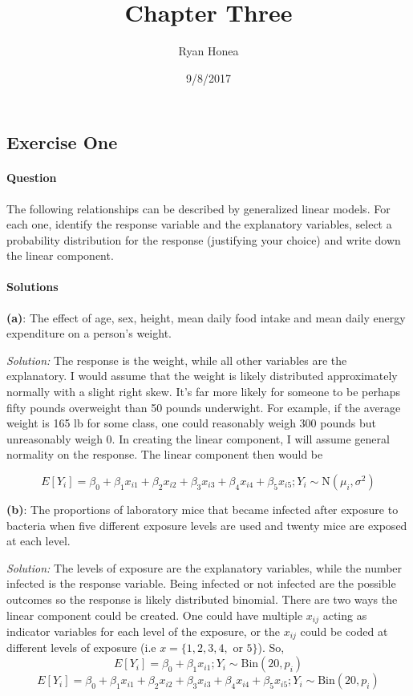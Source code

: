 \documentclass[]{article}
\title{Chapter Three}
\author{Ryan Honea}
\date{9/8/2017}
\let\oldparagraph\paragraph
\renewcommand{\paragraph}[1]{\oldparagraph{#1}\mbox{}}
\begin{document}
\maketitle

\subsection{Exercise One}\label{exercise-one}

\paragraph{Question}\label{question}

The following relationships can be described by generalized linear
models. For each one, identify the response variable and the explanatory
variables, select a probability distribution for the response
(justifying your choice) and write down the linear component.

\paragraph{Solutions}\label{solutions}

\textbf{(a)}: The effect of age, sex, height, mean daily food intake and
mean daily energy expenditure on a person's weight.

\emph{Solution: } The response is the weight, while all other variables
are the explanatory. I would assume that the weight is likely
distributed approximately normally with a slight right skew. It's far
more likely for someone to be perhaps fifty pounds overweight than 50
pounds underwight. For example, if the average weight is 165 lb for some
class, one could reasonably weigh 300 pounds but unreasonably weigh 0.
In creating the linear component, I will assume general normality on the
response. The linear component then would be

\[E[Y_i] = \beta_0 + \beta_1x_{i1} + \beta_2x_{i2} + \beta_3x_{i3} + \beta_4x_{i4} + \beta_5x_{i5}; Y_i \sim \text{N}(\mu_i, \sigma^2)\]

\textbf{(b)}: The proportions of laboratory mice that became infected
after exposure to bacteria when five different exposure levels are used
and twenty mice are exposed at each level.

\emph{Solution: } The levels of exposure are the explanatory variables,
while the number infected is the response variable. Being infected or
not infected are the possible outcomes so the response is likely
distributed binomial. There are two ways the linear component could be
created. One could have multiple \(x_{ij}\) acting as indicator
variables for each level of the exposure, or the \(x_{ij}\) could be
coded at different levels of exposure (i.e
\(x = \{1,2,3,4, \text{ or } 5\}\)). So,
\[E[Y_i] = \beta_0 + \beta_1x_{i1}; Y_i \sim \text{Bin}(20, p_i)\]
\[E[Y_i] = \beta_0 + \beta_1x_{i1} + \beta_2x_{i2} + \beta_3x_{i3} + \beta_4x_{i4} + \beta_5x_{i5}; Y_i \sim \text{Bin}(20, p_i)\]
\end{document}
